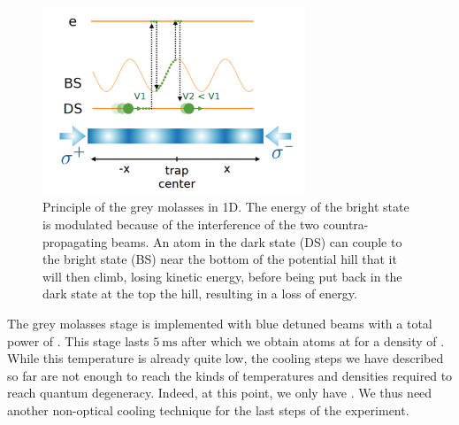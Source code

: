 \begin{figure}
    \centering
    \includegraphics[width=0.7\textwidth]{Fig/Chapter3/grey_molasses.png}
    \caption[Principle of the grey molasses in 1D]{Principle of the grey molasses in 1D. The energy of the bright state is modulated because of the interference of the two countra-propagating beams. An atom in the dark state (DS) can couple to the bright state (BS) near the bottom of the potential hill that it will then climb, losing kinetic energy, before being put back in the dark state at the top the hill, resulting in a loss of energy.}
    \label{fig:grey_molasses}
\end{figure}

The grey molasses stage is implemented with blue detuned  beams with a total power of . This stage lasts $5 \ \mathrm{ms}$ after which we obtain  atoms at  for a density of . While this temperature is already quite low, the cooling steps we have described so far are not enough to reach the kinds of temperatures and densities required to reach quantum degeneracy. Indeed, at this point, we only have . We thus need another non-optical cooling technique for the last steps of the experiment.

